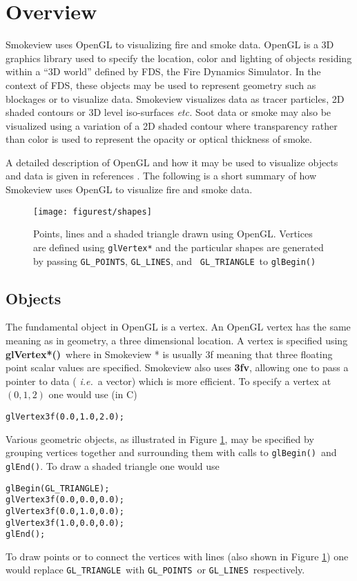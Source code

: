\section{Overview}
Smokeview uses OpenGL to visualizing fire and smoke data.  OpenGL
is a 3D graphics library used to specify the location, color and
lighting of objects residing within a ``3D world'' defined by FDS,
the Fire Dynamics Simulator. In the context of FDS, these objects
may be used to represent geometry such as blockages or to
visualize data. Smokeview visualizes data as tracer particles, 2D
shaded contours or 3D level iso-surfaces {\em etc.}  Soot data or
smoke may also be visualized using a variation of a 2D shaded
contour where transparency rather than color is used to represent
the opacity or optical thickness of smoke.

A detailed description of OpenGL and how it may be used to
visualize objects and data is given in references
\cite{OpenGLRed,SUPERBIBLE}. The following is a short summary of
how Smokeview uses OpenGL to visualize fire and smoke data.

\begin{figure}[t]
\begin{center}
\texttt{[image: figurest/shapes]}
\end{center}
\caption[Points, lines and a shaded triangle drawn using OpenGL.]
{Points, lines and a shaded triangle drawn using OpenGL. Vertices
are defined using {\tt glVertex*} and the particular shapes are
generated by passing {\tt GL\_POINTS}, {\tt GL\_LINES}, and {\tt
GL\_TRIANGLE}\ to {\tt glBegin()} } \label{figshapes}
\end{figure}
\subsection{Objects} The fundamental object in OpenGL is a
vertex. An OpenGL vertex has the same meaning as in geometry, a
three dimensional location. A vertex is specified using {\bf
glVertex*()}\ where in Smokeview * is usually 3f meaning that
three floating point scalar values are specified. Smokeview also
uses {\bf 3fv}, allowing one to pass a pointer to data ({\em
i.e.}\ a vector) which is more efficient. To specify a vertex at
$(0,1,2)$ one would use (in C)
\begin{verbatim}
glVertex3f(0.0,1.0,2.0);
\end{verbatim}
Various geometric objects, as illustrated in Figure
\ref{figshapes}, may be specified by grouping vertices together
and surrounding them with calls to {\tt glBegin()}\ and {\tt
glEnd()}. To draw a shaded triangle one would use
\begin{verbatim}
glBegin(GL_TRIANGLE);
glVertex3f(0.0,0.0,0.0);
glVertex3f(0.0,1.0,0.0);
glVertex3f(1.0,0.0,0.0);
glEnd();
\end{verbatim}
To draw points or to connect the vertices with lines (also shown
in Figure \ref{figshapes}) one would replace {\tt GL\_TRIANGLE}\
with {\tt GL\_POINTS}\ or {\tt GL\_LINES}\ respectively.

